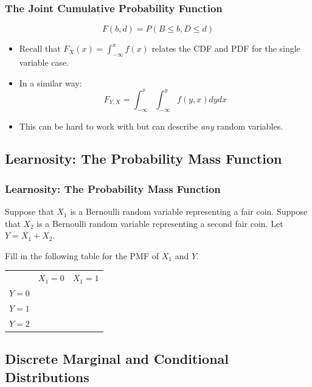 \documentclass[12pt, block=fill]{beamer}
\begin{document}
\begin{frame}
  \frametitle{The Joint Cumulative Probability Function}
  $$F(b,d) = P(B \leq b, D \leq d)$$
  
  \begin{itemize}
  \item Recall that $F_{X}(x) = \int_{-\infty}^{x}f(x)$ relates the CDF
    and PDF for the single variable case.
  \item In a similar way:
    $$F_{Y,X} = \int_{-\infty}^{x}\int_{-\infty}^{y}f(y,x) dy dx$$
  \item This can be hard to work with but can describe \textit{any}
    random variables.
  \end{itemize}
  
     
\end{frame}

\subsection{Learnosity: The Probability Mass Function}

\begin{frame}
  \frametitle{Learnosity: The Probability Mass Function}
  
  Suppose that $X_1$ is a Bernoulli random variable representing a
  fair coin.  Suppose that $X_2$ is a Bernoulli random variable
  representing a second fair coin.  Let $Y = X_1 + X_2$.
  
  Fill in the following table for the PMF of $X_1$ and $Y$.
  
  \begin{tabular}{c|c|c}
    & $X_1 = 0$ & $X_1 = 1$ \\
    $Y=0$ & &  \\  
    $Y=1$ &  & \\  
    $Y=2$ & & \\
  \end{tabular}
\end{frame}

\subsection{Discrete Marginal and Conditional Distributions} 
\end{document}
